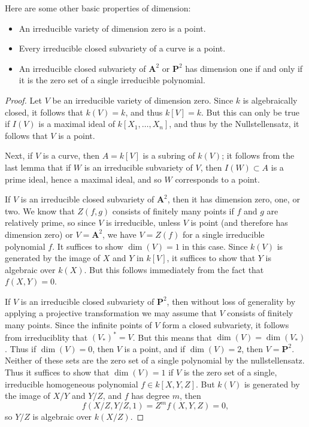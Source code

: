 \begin{theorem}
    Here are some other basic properties of dimension:
    \begin{itemize}
        \item An irreducible variety of dimension zero is a point.
        \item Every irreducible closed subvariety of a curve is a point.
        \item An irreducible closed subvariety of $\mathbf{A}^2$ or $\mathbf{P}^2$ has dimension one if and only if it is the zero set of a single irreducible polynomial.
    \end{itemize}
\end{theorem}
\begin{proof}
    Let $V$ be an irreducible variety of dimension zero. Since $k$ is algebraically closed, it follows that $k(V) = k$, and thus $k[V] = k$. But this can only be true if $I(V)$ is a maximal ideal of $k[X_1,\dots,X_n]$, and thus by the Nullstellensatz, it follows that $V$ is a point.

    Next, if $V$ is a curve, then $A = k[V]$ is a subring of $k(V)$; it follows from the last lemma that if $W$ is an irreducible subvariety of $V$, then $I(W) \subset A$ is a prime ideal, hence a maximal ideal, and so $W$ corresponds to a point.

    If $V$ is an irreducible closed subvariety of $\mathbf{A}^2$, then it has dimension zero, one, or two. We know that $Z(f,g)$ consists of finitely many points if $f$ and $g$ are relatively prime, so since $V$ is irreducible, unless $V$ is point (and therefore has dimension zero) or $V = \mathbf{A}^2$, we have $V = Z(f)$ for a single irreducible polynomial $f$. It suffices to show $\dim(V) = 1$ in this case. Since $k(V)$ is generated by the image of $X$ and $Y$ in $k[V]$, it suffices to show that $Y$ is algebraic over $k(X)$. But this follows immediately from the fact that $f(X,Y) = 0$.

    If $V$ is an irreducible closed subvariety of $\mathbf{P}^2$, then without loss of generality by applying a projective transformation we may assume that $V$ consists of finitely many points. Since the infinite points of $V$ form a closed subvariety, it follows from irreduciblity that $(V_*)^* = V$. But this means that $\dim(V) = \dim(V_*)$. Thus if $\dim(V) = 0$, then $V$ is a point, and if $\dim(V) = 2$, then $V = \mathbf{P}^2$. Neither of these sets are the zero set of a single polynomial by the nullstellensatz. Thus it suffices to show that $\dim(V) = 1$ if $V$ is the zero set of a single, irreducible homogeneous polynomial $f \in k[X,Y,Z]$. But $k(V)$ is generated by the image of $X/Y$ and $Y/Z$, and $f$ has degree $m$, then
    \[ f(X/Z,Y/Z,1) = Z^m f(X,Y,Z) = 0, \]
    so $Y/Z$ is algebraic over $k(X/Z)$.
\end{proof}

